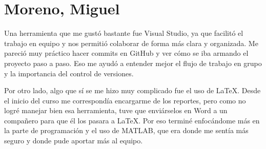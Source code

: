 \section{Moreno, Miguel}
Una herramienta que me gustó bastante fue Visual Studio, ya que facilitó el trabajo en equipo y nos permitió colaborar de forma más clara y organizada. Me pareció muy práctico hacer commits en GitHub y ver cómo se iba armando el proyecto paso a paso. Eso me ayudó a entender mejor el flujo de trabajo en grupo y la importancia del control de versiones.

Por otro lado, algo que sí se me hizo muy complicado fue el uso de LaTeX. Desde el inicio del curso me correspondía encargarme de los reportes, pero como no logré manejar bien esa herramienta, tuve que enviárselos en Word a un compañero para que él los pasara a LaTeX. Por eso terminé enfocándome más en la parte de programación y el uso de MATLAB, que era donde me sentía más seguro y donde pude aportar más al equipo.